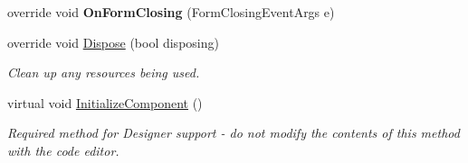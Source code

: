 \begin{DoxyCompactItemize}
\item 
\hypertarget{classlib_watcher_dialog_1_1_property_form_3_01_t_00_01_t2_01_4_a0ef26d8cf987c2e8f23b0ff73924d98c}{override void {\bfseries On\+Form\+Closing} (Form\+Closing\+Event\+Args e)}\label{classlib_watcher_dialog_1_1_property_form_3_01_t_00_01_t2_01_4_a0ef26d8cf987c2e8f23b0ff73924d98c}

\item 
override void \hyperlink{classlib_watcher_dialog_1_1_property_form_3_01_t_00_01_t2_01_4_a7feb611dced7356f7a0f4dc9fa1d73e9}{Dispose} (bool disposing)
\begin{DoxyCompactList}\small\item\em Clean up any resources being used. \end{DoxyCompactList}\item 
virtual void \hyperlink{classlib_watcher_dialog_1_1_property_form_3_01_t_00_01_t2_01_4_a46d9bc03593bef5fdd6dd2d19fc4c8bd}{Initialize\+Component} ()
\begin{DoxyCompactList}\small\item\em Required method for Designer support -\/ do not modify the contents of this method with the code editor. \end{DoxyCompactList}\end{DoxyCompactItemize}
